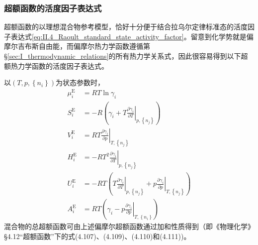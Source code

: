 \documentclass[main.tex]{subfiles}
\begin{document}
\subsubsection{超额函数的活度因子表达式}
超额函数的以理想混合物参考模型，恰好十分便于结合拉乌尔定律标准态的活度因子表达式\eqref{eq:II.4_Raoult_standard_state_activity_factor}。留意到化学势就是偏摩尔吉布斯自由能，而偏摩尔热力学函数遵循第\S\ref{sec:I_thermodynamic_relations}的所有热力学关系式，因此很容易得到以下超额热力学函数的活度因子表达式。

以$\left(T,p,\left\{n_i\right\}\right)$为状态参数时，
\begin{align}
    \mu_i^\text{E} & =RT\ln\gamma_i                                                                                                                                                     \\
    S_i^\text{E}   & =-R\left(\gamma_i+T\left.\frac{\partial\gamma_i}{\partial T}\right|_{p,\left\{n_j\right\}}\right)                                                                  \\
    V_i^\text{E}   & =RT\left.\frac{\partial\gamma_i}{\partial p}\right|_{T,\left\{n_j\right\}}                                                                                         \\
    H_i^\text{E}   & =-RT^2\left.\frac{\partial\gamma_i}{\partial T}\right|_{p,\left\{n_j\right\}}                                                                                      \\
    U_i^\text{E}   & =-RT\left(T\left.\frac{\partial\gamma_i}{\partial T}\right|_{p,\left\{n_j\right\}}+p\left.\frac{\partial\gamma_i}{\partial p}\right|_{T,\left\{n_j\right\}}\right) \\
    A_i^\text{E}   & =RT\left(\gamma_i-p\left.\frac{\partial\gamma_i}{\partial p}\right|_{T,\left\{n_i\right\}}\right)
\end{align}
混合物的总超额函数可由上述偏摩尔超额函数通过加和性质得到（即《物理化学》\S4.12“超额函数”下的式(4.107)、(4.109)、(4.110)和(4.111))。
\end{document}
